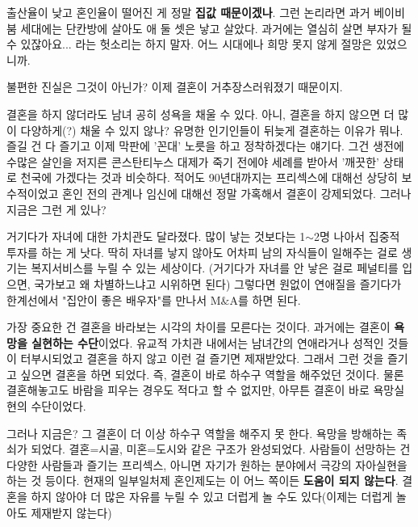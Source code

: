 출산율이 낮고 혼인율이 떨어진 게 정말 \textbf{집값 때문이겠나}.
그런 논리라면 과거 베이비붐 세대에는 단칸방에 살아도 애 둘 셋은 낳고 살았다.
과거에는 열심히 살면 부자가 될 수 있잖아요... 라는 헛소리는 하지 말자. 어느 시대에나 희망 못지 않게 절망은 있었으니까.
\vspace{5mm}

불편한 진실은 그것이 아닌가?
이제 결혼이 거추장스러워졌기 때문이지.
\vspace{5mm}

결혼을 하지 않더라도 남녀 공히 성욕을 채울 수 있다. 아니, 결혼을 하지 않으면 더 많이 다양하게(?) 채울 수 있지 않나?
유명한 인기인들이 뒤늦게 결혼하는 이유가 뭐나. 즐길 건 다 즐기고 이제 막판에 '꼰대' 노릇을 하고 정착하겠다는 얘기다.
그건 생전에 수많은 살인을 저지른 콘스탄티누스 대제가 죽기 전에야 세례를 받아서 '깨끗한' 상태로 천국에 가겠다는 것과 비슷하다.
적어도 90년대까지는 프리섹스에 대해선 상당히 보수적이었고 혼인 전의 관계나 임신에 대해선 정말 가혹해서 결혼이 강제되었다.
그러나 지금은 그런 게 있나?
\vspace{5mm}

거기다가 자녀에 대한 가치관도 달라졌다. 많이 낳는 것보다는 1$\sim$2명 나아서 집중적 투자를 하는 게 낫다.
딱히 자녀를 낳지 않아도 어차피 남의 자식들이 일해주는 걸로 생기는 복지서비스를 누릴 수 있는 세상이다.
(거기다가 자녀를 안 낳은 걸로 페널티를 입으면, 국가보고 왜 차별하느냐고 시위하면 된다)
그렇다면 원없이 연애질을 즐기다가 한계선에서 "집안이 좋은 배우자"를 만나서 M$\&$A를 하면 된다.
\vspace{5mm}

가장 중요한 건 결혼을 바라보는 시각의 차이를 모른다는 것이다.
과거에는 결혼이 \textbf{욕망을 실현하는 수단}이었다.
유교적 가치관 내에서는 남녀간의 연애라거나 성적인 것들이 터부시되었고 결혼을 하지 않고 이런 걸 즐기면 제재받았다.
그래서 그런 것을 즐기고 싶으면 결혼을 하면 되었다. 즉, 결혼이 바로 하수구 역할을 해주었던 것이다.
물론 결혼해놓고도 바람을 피우는 경우도 적다고 할 수 없지만, 아무튼 결혼이 바로 욕망실현의 수단이었다.
\vspace{5mm}

그러나 지금은? 그 결혼이 더 이상 하수구 역할을 해주지 못 한다. 욕망을 방해하는 족쇠가 되었다.
결혼=시골, 미혼=도시와 같은 구조가 완성되었다.
사람들이 선망하는 건 다양한 사람들과 즐기는 프리섹스, 아니면 자기가 원하는 분야에서 극강의 자아실현을 하는 것 등이다.
현재의 일부일처제 혼인제도는 이 어느 쪽이든 \textbf{도움이 되지 않는다}.
결혼을 하지 않아야 더 많은 자유를 누릴 수 있고 더럽게 놀 수도 있다(이제는 더럽게 놀아도 제재받지 않는다)
\vspace{5mm}

